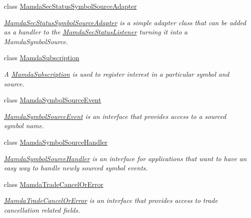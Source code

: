 \begin{CompactItemize}
class \hyperlink{classWombat_1_1MamdaSecStatusSymbolSourceAdapter}{Mamda\-Sec\-Status\-Symbol\-Source\-Adapter}
\begin{CompactList}\small\item\em \hyperlink{classWombat_1_1MamdaSecStatusSymbolSourceAdapter}{Mamda\-Sec\-Status\-Symbol\-Source\-Adapter} is a simple adapter class that can be added as a handler to the \hyperlink{classWombat_1_1MamdaSecStatusListener}{Mamda\-Sec\-Status\-Listener} turning it into a Mamda\-Symbol\-Source. \item\end{CompactList}\item 
class \hyperlink{classWombat_1_1MamdaSubscription}{Mamda\-Subscription}
\begin{CompactList}\small\item\em A \hyperlink{classWombat_1_1MamdaSubscription}{Mamda\-Subscription} is used to register interest in a particular symbol and source. \item\end{CompactList}\item 
class \hyperlink{classWombat_1_1MamdaSymbolSourceEvent}{Mamda\-Symbol\-Source\-Event}
\begin{CompactList}\small\item\em \hyperlink{classWombat_1_1MamdaSymbolSourceEvent}{Mamda\-Symbol\-Source\-Event} is an interface that provides access to a sourced symbol name. \item\end{CompactList}\item 
class \hyperlink{classWombat_1_1MamdaSymbolSourceHandler}{Mamda\-Symbol\-Source\-Handler}
\begin{CompactList}\small\item\em \hyperlink{classWombat_1_1MamdaSymbolSourceHandler}{Mamda\-Symbol\-Source\-Handler} is an interface for applications that want to have an easy way to handle newly sourced symbol events. \item\end{CompactList}\item 
class \hyperlink{classWombat_1_1MamdaTradeCancelOrError}{Mamda\-Trade\-Cancel\-Or\-Error}
\begin{CompactList}\small\item\em \hyperlink{classWombat_1_1MamdaTradeCancelOrError}{Mamda\-Trade\-Cancel\-Or\-Error} is an interface that provides access to trade cancellation related fields. \item\end{CompactList}\item 

\end{CompactItemize}
